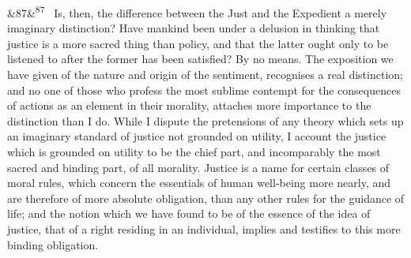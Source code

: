 \documentclass[12pt]{article}
\newcommand{\para}[1][]{\par\noindent\ifx&#1&\else\textsuperscript{\footnotesize #1}~\fi}
\begin{document}
\para[87] Is, then, the difference between the Just and the Expedient a merely imaginary distinction? Have mankind been under a delusion in thinking that justice is a more sacred thing than policy, and that the latter ought only to be listened to after the former has been satisfied? By no means. The exposition we have given of the nature and origin of the sentiment, recognises a real distinction; and no one of those who profess the most sublime contempt for the consequences of actions as an element in their morality, attaches more importance to the distinction than I do. While I dispute the pretensions of any theory which sets up an imaginary standard of justice not grounded on utility, I account the justice which is grounded on utility to be the chief part, and incomparably the most sacred and binding part, of all morality. Justice is a name for certain classes of moral rules, which concern the essentials of human well-being more nearly, and are therefore of more absolute obligation, than any other rules for the guidance of life; and the notion which we have found to be of the essence of the idea of justice, that of a right residing in an individual, implies and testifies to this more binding obligation.
\end{document}
